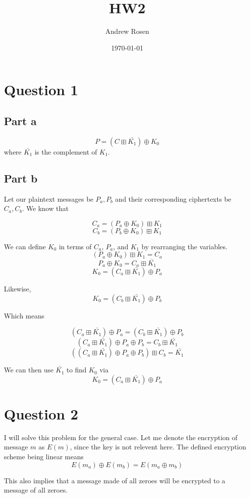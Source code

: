 \documentclass[a4paper,10pt]{article}
\title{HW2}
\author{Andrew Rosen}
\date{\today}
\begin{document}
\maketitle
\section{Question 1}

\subsection{Part a}
$$P = (C \boxplus \bar{K_{1}}) \oplus K_{0}$$ where $\bar{K_{1}}$ is the complement of $K_{1}$. 
\subsection{Part b}
Let our plaintext messages be $P_{a}, P_{b} $ and their corresponding ciphertexts be $C_{a}, C_{b}$.  We know that

$$ C_{a} = (P_{a} \oplus K_{0}) \boxplus K_{1} $$
$$ C_{b} = (P_{b} \oplus K_{0}) \boxplus K_{1} $$

We can define $K_{0}$ in terms of $C_{a}$, $P_{a}$, and $K_{1}$ by rearranging the variables.   
$$ (P_{a} \oplus K_{0}) \boxplus K_{1}  = C_{a} $$
$$  P_{a} \oplus K_{0} = C_{a} \boxplus \bar{K_{1}} $$
$$  K_{0} = (C_{a} \boxplus \bar{K_{1}}) \oplus P_{a} $$

Likewise,
$$  K_{0} = (C_{b} \boxplus \bar{K_{1}}) \oplus P_{b} $$

Which means

$$(C_{a} \boxplus \bar{K_{1}}) \oplus P_{a} = (C_{b} \boxplus \bar{K_{1}}) \oplus P_{b} $$
$$(C_{a} \boxplus \bar{K_{1}}) \oplus P_{a} \oplus P_{b} = C_{b} \boxplus \bar{K_{1}}$$
$$\left(\left(C_{a} \boxplus \bar{K_{1}}\right) \oplus P_{a} \oplus P_{b}\right) \boxplus C_{b} =  \bar{K_{1}}$$

We can then use  $\bar{K_{1}}$ to find $K_{0}$ via
$$  K_{0} = (C_{a} \boxplus \bar{K_{1}}) \oplus P_{a} $$
\section{Question 2}

I will solve this problem for the general case.  Let me denote the encryption of message $m$ as $E(m)$, since the key is not relevent here.  The defined encryption scheme being linear means 
$$E(m_{a}) \oplus E(m_{b})  =  E(m_{a} \oplus m_{b})$$

This also implies that a message made of all zeroes will be encrypted to a message of all zeroes.
\end{document}
